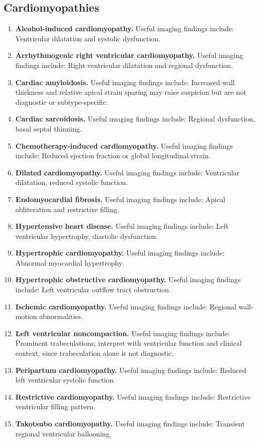 \subsection{Cardiomyopathies}
\begin{enumerate}[leftmargin=*,itemsep=0.45em,topsep=0.4em]
\item \textbf{Alcohol-induced cardiomyopathy.} Useful imaging findings include: Ventricular dilatation and systolic dysfunction.
\item \textbf{Arrhythmogenic right ventricular cardiomyopathy.} Useful imaging findings include: Right ventricular dilatation and regional dysfunction.
\item \textbf{Cardiac amyloidosis.} Useful imaging findings include: Increased wall thickness and relative apical strain sparing may raise suspicion but are not diagnostic or subtype-specific.
\item \textbf{Cardiac sarcoidosis.} Useful imaging findings include: Regional dysfunction, basal septal thinning.
\item \textbf{Chemotherapy-induced cardiomyopathy.} Useful imaging findings include: Reduced ejection fraction or global longitudinal strain.
\item \textbf{Dilated cardiomyopathy.} Useful imaging findings include: Ventricular dilatation, reduced systolic function.
\item \textbf{Endomyocardial fibrosis.} Useful imaging findings include: Apical obliteration and restrictive filling.
\item \textbf{Hypertensive heart disease.} Useful imaging findings include: Left ventricular hypertrophy, diastolic dysfunction.
\item \textbf{Hypertrophic cardiomyopathy.} Useful imaging findings include: Abnormal myocardial hypertrophy.
\item \textbf{Hypertrophic obstructive cardiomyopathy.} Useful imaging findings include: Left ventricular outflow tract obstruction.
\item \textbf{Ischemic cardiomyopathy.} Useful imaging findings include: Regional wall-motion abnormalities.
\item \textbf{Left ventricular noncompaction.} Useful imaging findings include: Prominent trabeculations; interpret with ventricular function and clinical context, since trabeculation alone is not diagnostic.
\item \textbf{Peripartum cardiomyopathy.} Useful imaging findings include: Reduced left ventricular systolic function.
\item \textbf{Restrictive cardiomyopathy.} Useful imaging findings include: Restrictive ventricular filling pattern.
\item \textbf{Takotsubo cardiomyopathy.} Useful imaging findings include: Transient regional ventricular ballooning.
\end{enumerate}


